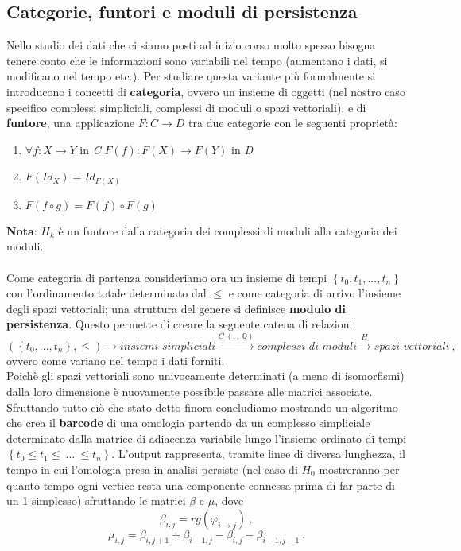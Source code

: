 \documentclass{article}
\begin{document}
	\subsection{Categorie, funtori e moduli di persistenza}
	Nello studio dei dati che ci siamo posti ad inizio corso molto spesso bisogna tenere conto che le informazioni sono variabili nel tempo (aumentano i dati, si modificano nel tempo etc.). Per studiare questa variante più formalmente si introducono i concetti di \textbf{categoria}, ovvero un insieme di oggetti (nel nostro caso specifico complessi simpliciali, complessi di moduli o spazi vettoriali), e di \textbf{funtore}, una applicazione \(F:C\rightarrow D\) tra due categorie con le seguenti proprietà:
	\begin{enumerate}
		\item \(\forall f:X\rightarrow Y\) in \textit{C} \(F(f):F(X)\rightarrow F(Y)\) in \textit{D}
		\item \(F(Id_X)=Id_{F(X)}\)
		\item \(F(f\circ g)=F(f)\circ F(g)\)
	\end{enumerate}
	\textbf{Nota}: \(H_k\) è un funtore dalla categoria dei complessi di moduli alla categoria dei moduli.\\ \\ Come categoria di partenza consideriamo ora un insieme di tempi \(\left\{t_0,t_1,...,t_n\right\}\) con l'ordinamento totale determinato dal \(\le\) e come categoria di arrivo l'insieme degli spazi vettoriali; una struttura del genere si definisce \textbf{modulo di persistenza}. Questo permette di creare la seguente catena di relazioni:
	\[(\left\{t_0,...,t_n\right\},\le)\rightarrow \textit{insiemi simpliciali}\xrightarrow{C_.(.\ ,\ \mathbb{Q})} \textit{complessi di moduli}\xrightarrow{H_.}\textit{spazi vettoriali}\ ,\]
	ovvero come variano nel tempo i dati forniti.\\
	Poichè gli spazi vettoriali sono univocamente determinati (a meno di isomorfismi) dalla loro dimensione è nuovamente possibile passare alle matrici associate.
	Sfruttando tutto ciò che stato detto finora concludiamo mostrando un algoritmo che crea il \textbf{barcode} di una omologia partendo da un complesso simpliciale determinato dalla matrice di adiacenza variabile lungo l'insieme ordinato di tempi \(\left\{t_0\le t_1\le \ ...\ \le t_n\right\}\). L'output rappresenta, tramite linee di diversa lunghezza, il tempo in cui l'omologia presa in analisi persiste (nel caso di \(H_0\) mostreranno per quanto tempo ogni vertice resta una componente connessa prima di far parte di un 1-simplesso) sfruttando le matrici \(\beta\) e \(\mu\), dove \[\beta_{i,j}=rg(\varphi_{i\rightarrow j})\ ,\] \[\mu_{i,j}=\beta_{i,j+1}+\beta_{i-1,j}-\beta_{i,j}-\beta_{i-1,j-1}\ .\]
	\vspace{1cm}
	
	\vspace{1cm}
	\vspace{1cm}
	
	\vspace{1cm}
	
\end{document}
